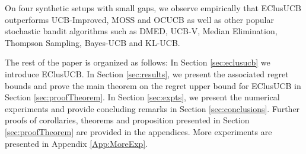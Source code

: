 On four synthetic setups with small gaps, we observe empirically that EClusUCB outperforms UCB-Improved\cite{auer2010ucb}, MOSS\cite{audibert2009minimax} and OCUCB\cite{lattimore2015optimally} as well as other popular stochastic bandit algorithms such as DMED\cite{honda2010asymptotically}, UCB-V\cite{audibert2009exploration}, Median Elimination\cite{even2006action}, Thompson Sampling\cite{agrawal2011analysis}, Bayes-UCB\cite{kaufmann2012bayesian} and KL-UCB\cite{garivier2011kl}. 

The rest of the paper is organized as follows: In Section \ref{sec:eclusucb} we introduce EClusUCB. In Section \ref{sec:results}, we present the associated regret bounds and prove the main theorem on the regret upper bound for EClusUCB in Section \ref{sec:proofTheorem}. In Section \ref{sec:expts}, we present the numerical experiments and provide concluding remarks in Section \ref{sec:conclusions}. Further proofs of corollaries, theorems and proposition presented in Section \ref{sec:proofTheorem} are provided in the appendices. More experiments are presented in Appendix \ref{App:MoreExp}. 
